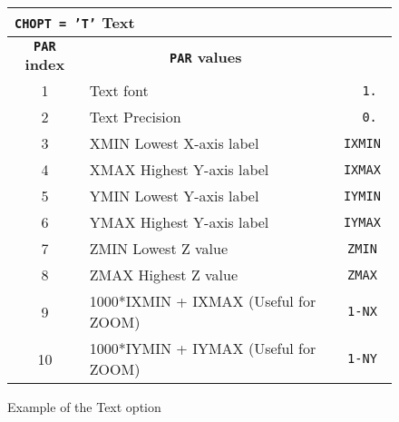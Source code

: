 \begin{figure}[p]
\begin{center}
\begin{tabular}{||c|p{}|>{\tt}r||}
\hline
\multicolumn{3}{||l||}{\bf {\tt CHOPT = 'T'} Text}             \\
\hline
\multicolumn{1}{||c|}{\bf {\tt PAR} index}           &
\multicolumn{1}{c|}{\bf {\tt PAR} values}            &
\multicolumn{1}{c||}{\bf default}                              \\
\hline
1  & Text font                                                      &   1.    \\
2  & Text Precision                                                 &   0.    \\
3  & XMIN Lowest X-axis label                                       &   IXMIN \\
4  & XMAX Highest Y-axis label                                      &   IXMAX \\
5  & YMIN Lowest Y-axis label                                       &   IYMIN \\
6  & YMAX Highest Y-axis label                                      &   IYMAX \\
7  & ZMIN Lowest Z value                                            &   ZMIN  \\
8  & ZMAX Highest Z value                                           &   ZMAX  \\
9  & 1000*IXMIN + IXMAX (Useful for ZOOM)                           &   1-NX  \\
10 & 1000*IYMIN + IYMAX (Useful for ZOOM)                           &   1-NY  \\
\hline
\end{tabular}
\end{center}

\bigskip

\begin{center} \mbox{} \end{center}
\caption{Example of the \protect{} Text option}
\label{TABT}
\end{figure}

